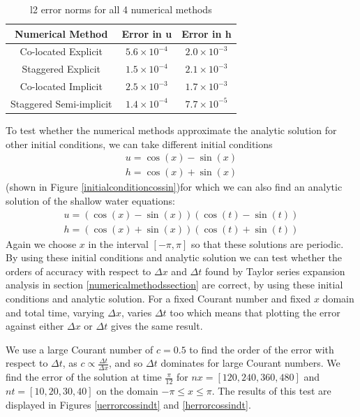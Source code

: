 \documentclass[a4paper, 10.5pt, notitlepage]{article}
\begin{document}
\begin{table}[H]
	\centering
	\begin{tabular}{|c | c| c|} 
		\hline
		\textbf{Numerical Method} & \textbf{Error in u} & \textbf{Error in h}  \\
		\hline
		Co-located Explicit & $5.6 \times 10^{-4}$ & $2.0 \times 10^{-3}$\\ 
		\hline
		Staggered Explicit &  $1.5 \times 10^{-4}$ & $2.1 \times 10^{-3}$\\
		\hline
		Co-located  Implicit & $2.5 \times 10^{-3}$ & $1.7 \times 10^{-3}$ \\
		\hline
		Staggered Semi-implicit & $1.4 \times 10^{-4}$ & $7.7\times 10 ^{-5}$ \\
	\hline
	\end{tabular}
	\caption{l2 error norms for all 4 numerical methods}
	\label{errortable}
\end{table}

To test whether the numerical methods approximate the analytic solution for other initial conditions, we can take different initial conditions
\begin{eqnarray} \label{ic}
u  =  \cos(x) - \sin(x)\\
 h  =  \cos(x) + \sin(x)
\end{eqnarray}
(shown in Figure \ref{initialconditioncossin})for which we can also find an analytic solution of the shallow water equations:
\begin{eqnarray} \label{as}
u = (\cos(x) - \sin(x))(\cos(t) - \sin(t))\\
h = (\cos(x) + \sin(x))(\cos(t) + \sin(t))
\end{eqnarray}
Again we choose $x$ in the interval $[-\pi, \pi]$ so that these solutions are periodic. By using these initial conditions and analytic solution we can test whether the orders of accuracy with respect to $\Delta x$ and $\Delta t$ found by Taylor series expansion analysis in section \ref{numericalmethodssection} are correct, by using these initial conditions and analytic solution. For a fixed Courant number and fixed $x$ domain and total time, varying $\Delta x$, varies $\Delta t$ too which means that plotting the error against either $\Delta x$ or $\Delta t$ gives the same result.  

We use a large Courant number of $c = 0.5$ to find the order of the error with respect to $\Delta t$, as $c \propto \frac{\Delta t}{\Delta x}$, and so $\Delta t$ dominates for large Courant numbers. We find the error of the solution at time $\frac{\pi}{12}$ for $nx = [120, 240, 360, 480]$ and $nt = [10, 20, 30, 40]$ on the domain $-\pi \leq x \leq \pi$. The results of this test are displayed in Figures \ref{uerrorcossindt} and \ref{herrorcossindt}.
\end{document}
